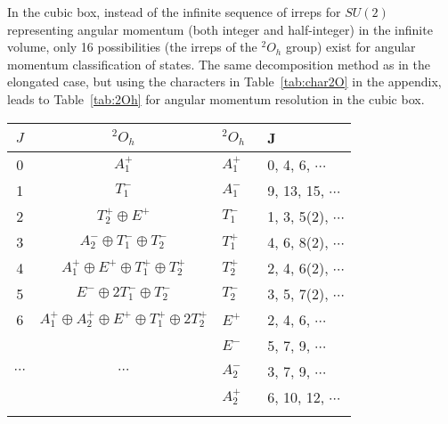 \documentclass[aps,prd,reprint,showpacs,floatfix,longbibliography,,superscriptaddress]{revtex4-1}
\begin{document}
\begin{widetext}
In the cubic box,
instead of the infinite sequence of irreps for $SU(2)$ representing angular momentum (both integer and half-integer) in the infinite volume,  only 16 possibilities (the irreps of the $^2O_h$ group) exist for angular momentum 
classification of states. 
The same decomposition method as in the elongated case, but using the characters in Table~\ref{tab:char2O} in the appendix,  leads to Table~\ref{tab:2Oh} for angular momentum resolution in the cubic box.
%
\begin{table}
\begin{tabular}{c c | l l}\toprule
$J$ & $^2O_h$  &  $^2O_h\;\;$ &  J\\
\hline
0 & $A^+_1$                                                               & $A^+_1\;\;$  & 0, 4, 6, $\cdots$ \\
1 & $T^-_1$                                                                & $A^-_1\;\;$  & 9, 13, 15, $\cdots$ \\
2 &  $T^+_2\oplus E^+$                                             & $T^-_1\;\;$  & 1, 3, 5(2),  $\cdots$ \\
3 & $A^-_2 \oplus T^-_1\oplus T^-_2$                       &  $T^+_1\;\;$  & 4, 6, 8(2),  $\cdots$  \\
4 & $A^+_1 \oplus E^+ \oplus T^+_1 \oplus T^+_2$  & $T^+_2\;\;$  & 2, 4,  6(2), $\cdots$ \\
5 & $ E^- \oplus  2T^-_1 \oplus T^-_2$                      & $T^-_2\;\;$  & 3, 5, 7(2), $\cdots$ \\
6 & $ A^+_1 \oplus A^+_2 \oplus E^+ \oplus  T^+_1 \oplus 2T^+_2$                    & $E^+\;\;$     & 2, 4, 6, $\cdots$ \\
&                                                                                 &  $E^-\;\;$     & 5, 7, 9,  $\cdots$ \\
$\cdots$ & $\cdots$                                                    &  $A^-_2\;\;$  & 3, 7, 9,  $\cdots$  \\
&                                                                                 & $A^+_2\;\;$  &  6, 10, 12,   $\cdots$ \\
&                                                                                 & & \\


\end{tabular}
\end{table}
\end{widetext}
\end{document}
